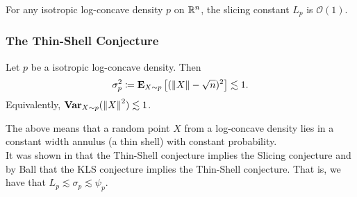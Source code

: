 \begin{fcon}
	\label{slicing conjecture}
	For any isotropic log-concave density $p$ on $\mathbb{R}^n$, the slicing constant $L_p$ is $\mathcal{O}(1)$.
\end{fcon}

\subsubsection{The Thin-Shell Conjecture}

\begin{fcon}
	\label{con: thin shell conjecture}
	Let $p$ be a isotropic log-concave density. Then
	\[ \sigma_p^2 \coloneqq \textbf{E}_{X\sim p}\left[(\left\lVert X\right\rVert-\sqrt{n})^2\right] \lesssim 1. \]
	Equivalently, $\operatorname{\textbf{Var}}_{X\sim p}(\left\lVert X\right\rVert^2) \lesssim 1$.
\end{fcon}

The above means that a random point $X$ from a log-concave density lies in a constant width annulus (a thin shell) with constant probability.\\

It was shown in \cite{Eldan2010ApproximatelyGM} that the Thin-Shell conjecture implies the Slicing conjecture and by Ball that the KLS conjecture implies the Thin-Shell conjecture. That is, we have that $L_p \lesssim \sigma_p \lesssim \psi_p$.
